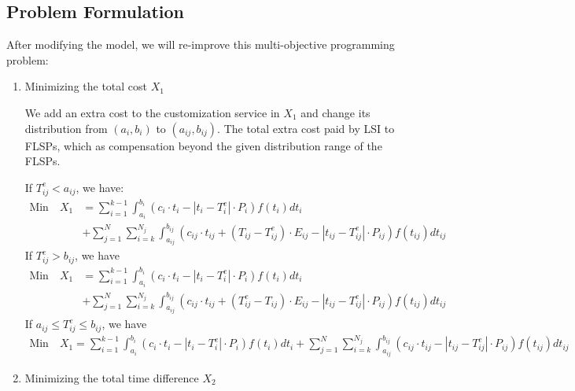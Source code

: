 \documentclass{llncs}
\begin{document}
    \subsection{Problem Formulation}
    After modifying the model, we will re-improve this multi-objective programming problem:
    \begin{enumerate}
    \item Minimizing the total cost $X_1$

    We add an extra cost to the customization service in $X_1$ and change its distribution from $(a_i,b_i)$ to $(a_{ij},b_{ij})$. The total extra cost paid by LSI to FLSPs, which as compensation beyond the given distribution range of the FLSPs.

    If $T_{ij}^e<a_{ij}$, we have:
    \begin{equation}
    \begin{aligned}\label{goal-6}
        \text{Min} \quad X_1&=\sum_{i=1}^{k-1}\int_{a_i}^{b_i}(c_i\cdot t_i-|t_i-T_i^e|\cdot P_i)f(t_i)dt_i\\&+\sum_{j=1}^N\sum_{i=k}^{N_j}\int_{a_{ij}}^{b_{ij}}(c_{ij}\cdot t_{ij}+(T_{ij}-T_{ij}^e)\cdot E_{ij}-|t_{ij}-T_{ij}^e|\cdot P_{ij})f(t_{ij})dt_{ij}
    \end{aligned}
    \end{equation}
    If $T_{ij}^e>b_{ij}$, we have
    \begin{equation}
    \begin{aligned}\label{goal-7}
        \text{Min} \quad X_1&=\sum_{i=1}^{k-1}\int_{a_i}^{b_i}(c_i\cdot t_i-|t_i-T_i^e|\cdot P_i)f(t_i)dt_i\\&+\sum_{j=1}^N\sum_{i=k}^{N_j}\int_{a_{ij}}^{b_{ij}}(c_{ij}\cdot t_{ij}+(T_{ij}^e-T_{ij})\cdot E_{ij}-|t_{ij}-T_{ij}^e|\cdot P_{ij})f(t_{ij})dt_{ij}
    \end{aligned}
    \end{equation}
    If $a_{ij}\leq T_{ij}^e\leq b_{ij}$, we have
    \begin{equation}
    \begin{aligned}\label{goal-8}
        \text{Min} \quad X_1=\sum_{i=1}^{k-1}\int_{a_i}^{b_i}(c_i\cdot t_i-|t_i-T_i^e|\cdot P_i)f(t_i)dt_i+\sum_{j=1}^N\sum_{i=k}^{N_j}\int_{a_{ij}}^{b_{ij}}(c_{ij}\cdot t_{ij}-|t_{ij}-T_{ij}^e|\cdot P_{ij})f(t_{ij})dt_{ij}
    \end{aligned}
    \end{equation}

    \item Minimizing the total time difference $X_2$


\end{enumerate}
\end{document}
